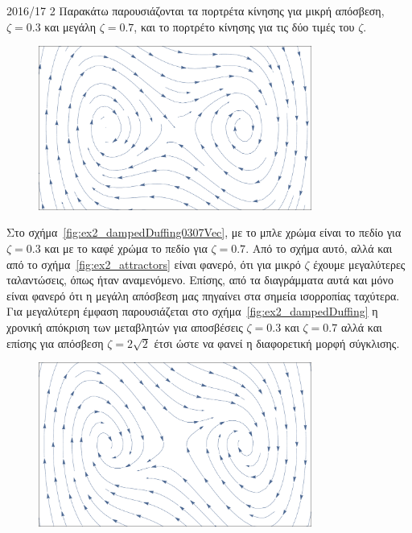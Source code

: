 \begin{solution}{2016/17 2}
    Παρακάτω παρουσιάζονται τα πορτρέτα κίνησης για μικρή απόσβεση,
    \( \zeta = 0.3 \) και μεγάλη \( \zeta = 0.7 \), και το πορτρέτο κίνησης
    για τις δύο τιμές του \( \zeta \).
    \begin{figure}[h]
        \centering
        \includegraphics[width=0.8\textwidth]{figures/ex2_dampedDuffing03Vec.pdf}
        \caption{}
        \label{fig:ex2_dampedDuffing03Vec}
    \end{figure}
    Στο σχήμα~\ref{fig:ex2_dampedDuffing0307Vec}, με το μπλε χρώμα είναι το πεδίο
    για \( \zeta = 0.3 \) και με το καφέ χρώμα το πεδίο για
    \( \zeta = 0.7 \). Από το σχήμα αυτό, αλλά και από το
    σχήμα~\ref{fig:ex2_attractors} είναι φανερό, ότι για μικρό \( \zeta \)
    έχουμε μεγαλύτερες ταλαντώσεις, όπως ήταν αναμενόμενο. Επίσης, από τα διαγράμματα
    αυτά και μόνο είναι φανερό ότι η μεγάλη απόσβεση μας πηγαίνει στα σημεία ισορροπίας
    ταχύτερα. Για μεγαλύτερη έμφαση παρουσιάζεται στο
    σχήμα~\ref{fig:ex2_dampedDuffing} η χρονική απόκριση των μεταβλητών για
    αποσβέσεις \( \zeta = 0.3 \) και \( \zeta = 0.7 \) αλλά και επίσης για
    απόσβεση \( \zeta = 2\sqrt{2} \) έτσι ώστε να φανεί η διαφορετική μορφή σύγκλισης.
    \begin{figure}[h!]
        \centering
        \includegraphics[width=0.8\textwidth]{figures/ex2_dampedDuffing07Vec.pdf}

\end{figure}
\end{solution}
